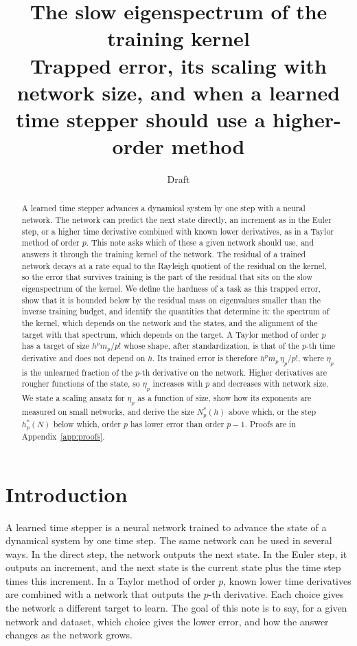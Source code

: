 \documentclass[11pt]{article}
\title{The slow eigenspectrum of the training kernel\\[4pt]
\large Trapped error, its scaling with network size, and when a learned time stepper should use a higher-order method}
\author{Draft}
\date{}
\theoremstyle{definition}
\theoremstyle{remark}
\begin{document}
\maketitle

\begin{abstract}
A learned time stepper advances a dynamical system by one step with a neural network.
The network can predict the next state directly, an increment as in the Euler step, or a higher time derivative combined with known lower derivatives, as in a Taylor method of order $p$.
This note asks which of these a given network should use, and answers it through the training kernel of the network.
The residual of a trained network decays at a rate equal to the Rayleigh quotient of the residual on the kernel, so the error that survives training is the part of the residual that sits on the slow eigenspectrum of the kernel.
We define the hardness of a task as this trapped error, show that it is bounded below by the residual mass on eigenvalues smaller than the inverse training budget, and identify the quantities that determine it: the spectrum of the kernel, which depends on the network and the states, and the alignment of the target with that spectrum, which depends on the target.
A Taylor method of order $p$ has a target of size $h^p m_p/p!$ whose shape, after standardization, is that of the $p$-th time derivative and does not depend on $h$.
Its trained error is therefore $h^p m_p\,\eta_p/p!$, where $\eta_p$ is the unlearned fraction of the $p$-th derivative on the network.
Higher derivatives are rougher functions of the state, so $\eta_p$ increases with $p$ and decreases with network size.
We state a scaling ansatz for $\eta_p$ as a function of size, show how its exponents are measured on small networks, and derive the size $N_p^\ast(h)$ above which, or the step $h_p^\ast(N)$ below which, order $p$ has lower error than order $p-1$.
Proofs are in Appendix~\ref{app:proofs}.
\end{abstract}

\tableofcontents

\section{Introduction}\label{sec:intro}

A learned time stepper is a neural network trained to advance the state of a dynamical system by one time step.
The same network can be used in several ways.
In the direct step, the network outputs the next state.
In the Euler step, it outputs an increment, and the next state is the current state plus the time step times this increment.
In a Taylor method of order $p$, known lower time derivatives are combined with a network that outputs the $p$-th derivative.
Each choice gives the network a different target to learn.
The goal of this note is to say, for a given network and dataset, which choice gives the lower error, and how the answer changes as the network grows.
\end{document}
